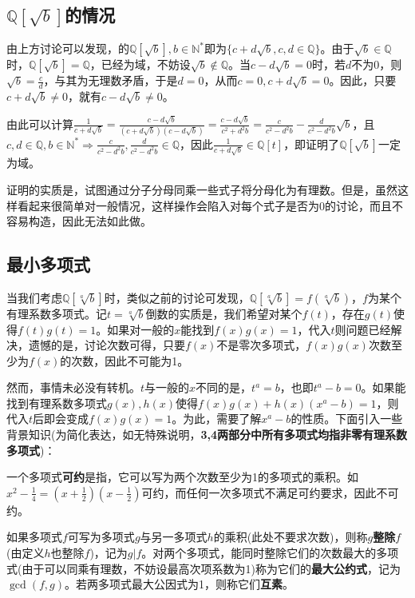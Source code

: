 \documentclass[UTF8]{ctexart}
\begin{document}
\subsection{$\mathbb{Q}[\sqrt{b}]$的情况}
由上方讨论可以发现，的$\mathbb{Q}[\sqrt{b}],b\in\mathbb{N}^*$即为$\{c+d\sqrt{b},c,d\in\mathbb{Q}\}$。由于$\sqrt{b}\in\mathbb{Q}$时，$\mathbb{Q}[\sqrt{b}]=\mathbb{Q}$，已经为域，不妨设$\sqrt{b}\notin\mathbb{Q}$。当$c-d\sqrt{b}=0$时，若$d$不为0，则$\sqrt{b}=\frac{c}{d}$，与其为无理数矛盾，于是$d=0$，从而$c=0,c+d\sqrt{b}=0$。因此，只要$c+d\sqrt{b}\neq0$，就有$c-d\sqrt{b}\neq0$。

由此可以计算$\frac{1}{c+d\sqrt{b}}=\frac{c-d\sqrt{b}}{(c+d\sqrt{b})(c-d\sqrt{b})}=\frac{c-d\sqrt{b}}{c^2+d^2b}=\frac{c}{c^2-d^2b}-\frac{d}{c^2-d^2b}\sqrt{b}$，且$c,d\in\mathbb{Q},b\in\mathbb{N}^*\Rightarrow\frac{c}{c^2-d^2b},\frac{d}{c^2-d^2b}\in\mathbb{Q}$，因此$\frac{1}{c+d\sqrt{b}}\in\mathbb{Q}[t]$，即证明了$\mathbb{Q}[\sqrt{b}]$一定为域。

证明的实质是，试图通过分子分母同乘一些式子将分母化为有理数。但是，虽然这样看起来很简单对一般情况，这样操作会陷入对每个式子是否为0的讨论，而且不容易构造，因此无法如此做。	

\subsection{最小多项式}
当我们考虑$\mathbb{Q}[\sqrt[a]b]$时，类似之前的讨论可发现，$\mathbb{Q}[\sqrt[a]b]=f(\sqrt[a]b)$，$f$为某个有理系数多项式。记$t=\sqrt[a]b$倒数的实质是，我们希望对某个$f(t)$，存在$g(t)$使得$f(t)g(t)=1$。如果对一般的$x$能找到$f(x)g(x)=1$，代入$t$则问题已经解决，遗憾的是，讨论次数可得，只要$f(x)$不是零次多项式，$f(x)g(x)$次数至少为$f(x)$的次数，因此不可能为1。

然而，事情未必没有转机。$t$与一般的$x$不同的是，$t^a=b$，也即$t^a-b=0$。如果能找到有理系数多项式$g(x),h(x)$使得$f(x)g(x)+h(x)(x^a-b)=1$，则代入$t$后即会变成$f(x)g(x)=1$。为此，需要了解$x^a-b$的性质。下面引入一些背景知识(为简化表达，如无特殊说明，\textbf{3,4两部分中所有多项式均指非零有理系数多项式})：

一个多项式\textbf{可约}是指，它可以写为两个次数至少为1的多项式的乘积。如$x^2-\frac{1}{4}=(x+\frac{1}{2})(x-\frac{1}{2})$可约，而任何一次多项式不满足可约要求，因此不可约。

如果多项式$f$可写为多项式$g$与另一多项式$h$的乘积(此处不要求次数)，则称$g$\textbf{整除}$f$(由定义$h$也整除$f$)，记为$g|f$。对两个多项式，能同时整除它们的次数最大的多项式(由于可以同乘有理数，不妨设最高次项系数为1)称为它们的\textbf{最大公约式}，记为$\gcd(f,g)$。若两多项式最大公因式为1，则称它们\textbf{互素}。
\end{document}
